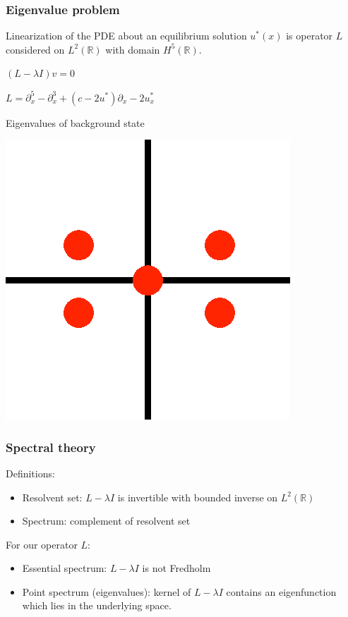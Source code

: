 \documentclass[16pt]{beamer}
\begin{document}
\begin{frame}
	\frametitle{Eigenvalue problem}
	\fontsize{16}{7.2}\selectfont
	Linearization of the PDE about an equilibrium solution $u^*(x)$ is operator $L$ considered on $L^2(\mathbb{R})$ with domain $H^5(\mathbb{R})$.

	\begin{center}
		$(L - \lambda I )v = 0$
	\end{center}

	\begin{center}
		$L = \partial_x^5 - \partial_x^3 + (c - 2 u^*)\partial_x - 2 u^*_x $
	\end{center}
	Eigenvalues of background state
	\begin{center}
		\includegraphics[width=0.2\linewidth]{images/eignonhyp.eps}
	\end{center}
\end{frame}

\begin{frame}
	\frametitle{Spectral theory}
	\fontsize{16}{7.2}\selectfont
	Definitions:
	\begin{itemize}
		\item Resolvent set: $L - \lambda I$ is invertible with bounded inverse on $L^2(\mathbb{R})$
		\vspace{0.5cm}
		\item Spectrum: complement of resolvent set
	\end{itemize}
	\vspace{1cm}
	For our operator $L$:
	\begin{itemize}
		\item Essential spectrum: $L - \lambda I$ is not Fredholm
		\vspace{0.5cm}
		\item Point spectrum (eigenvalues): kernel of $L - \lambda I$ contains an eigenfunction which lies in the underlying space.
	\end{itemize}
\end{frame}
\end{document}
